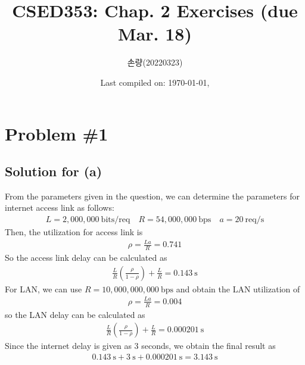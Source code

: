 \documentclass{scrartcl}
\title{CSED353: Chap. 2 Exercises (due Mar. 18)}
\author{손량(20220323)}
\date{Last compiled on: \today, \currenttime}
\newcommand{\un}[1]{\ensuremath{\ \mathrm{#1}}}
\begin{document}
\maketitle

\section{Problem \#1}

\subsection{Solution for (a)}
From the parameters given in the question, we can determine the parameters for
internet access link as follows:
\begin{align*}
  L = 2,000,000 \un{bits/req} \quad
  R = 54,000,000 \un{bps} \quad
  a = 20 \un{req/s}
\end{align*}
Then, the utilization for access link is
\begin{align*}
  \rho = \frac{La}{R} = 0.741
\end{align*}
So the access link delay can be calculated as
\begin{align*}
  \frac{L}{R} \left( \frac{\rho}{1 - \rho} \right) + \frac{L}{R}
  = 0.143 \un{s}
\end{align*}
For LAN, we can use \(R = 10,000,000,000 \un{bps}\) and obtain the LAN
utilization of
\begin{align*}
  \rho = \frac{La}{R} = 0.004
\end{align*}
so the LAN delay can be calculated as
\begin{align*}
  \frac{L}{R} \left( \frac{\rho}{1 - \rho} \right) + \frac{L}{R}
  = 0.000201 \un{s}
\end{align*}
Since the internet delay is given as 3 seconds, we obtain the final result as
\begin{align*}
  0.143 \un{s} + 3 \un{s} + 0.000201 \un{s} = 3.143 \un{s}
\end{align*}
\end{document}
